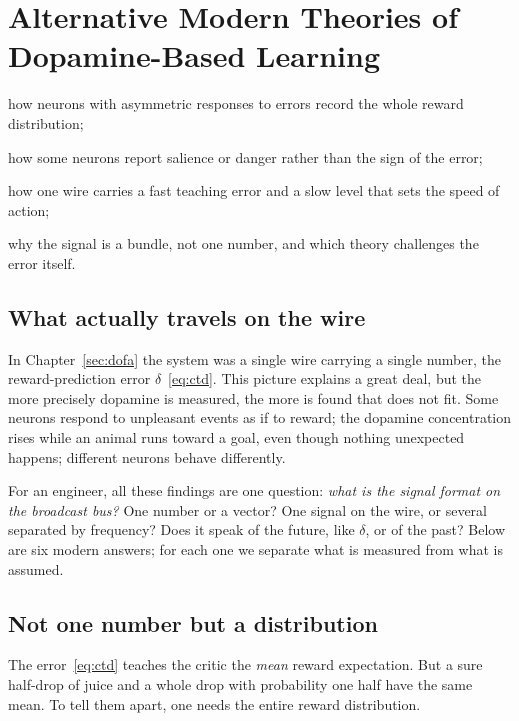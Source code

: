 \chapter{Alternative Modern Theories of Dopamine-Based Learning}
\label{sec:dofaalt}
\begin{chaptergoals}
\item how  neurons with asymmetric responses to errors record the whole reward distribution;
\item how some  neurons report salience or danger rather than the sign of the error;
\item how one wire carries a fast teaching error and a slow level that sets the speed of action;
\item why the  signal is a bundle, not one number, and which theory challenges the error itself.
\end{chaptergoals}

\section{What actually travels on the wire}

In Chapter~\ref{sec:dofa} the  system was a single wire carrying a single number, the reward-prediction error $\delta$~\eqref{eq:ctd}. This picture explains a great deal, but the more precisely dopamine is measured, the more is found that does not fit. Some neurons respond to unpleasant events as if to reward; the dopamine concentration rises while an animal runs toward a goal, even though nothing unexpected happens; different  neurons behave differently.

For an engineer, all these findings are one question: \emph{what is the signal format on the broadcast bus?} One number or a vector? One signal on the wire, or several separated by frequency? Does it speak of the future, like $\delta$, or of the past? Below are six modern answers; for each one we separate what is measured from what is assumed.

\section{Not one number but a distribution}

The error~\eqref{eq:ctd} teaches the critic the \emph{mean} reward expectation. But a sure half-drop of juice and a whole drop with probability one half have the same mean. To tell them apart, one needs the entire reward distribution.

